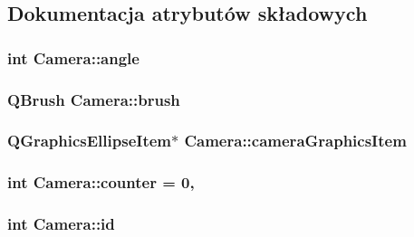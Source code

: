 \subsection{Dokumentacja atrybutów składowych}
\hypertarget{class_camera_af03876fc053f6ec72bab934db895a3bf}{
\subsubsection[{angle}]{\setlength{\rightskip}{0pt plus 5cm}int Camera\-::angle\hspace{0.3cm}{\ttfamily [private]}}}\label{class_camera_af03876fc053f6ec72bab934db895a3bf}
\hypertarget{class_camera_a42fec17d586950465bc8b04e72654462}{
\subsubsection[{brush}]{\setlength{\rightskip}{0pt plus 5cm}Q\-Brush Camera\-::brush\hspace{0.3cm}{\ttfamily [private]}}}\label{class_camera_a42fec17d586950465bc8b04e72654462}
\hypertarget{class_camera_afe62e86c4583ff405bf04251b56d38d0}{
\subsubsection[{camera\-Graphics\-Item}]{\setlength{\rightskip}{0pt plus 5cm}Q\-Graphics\-Ellipse\-Item$\ast$ Camera\-::camera\-Graphics\-Item\hspace{0.3cm}{\ttfamily [private]}}}\label{class_camera_afe62e86c4583ff405bf04251b56d38d0}
\hypertarget{class_camera_a26c98856bed4d250d0b042f71881b42c}{
\subsubsection[{counter}]{\setlength{\rightskip}{0pt plus 5cm}int Camera\-::counter = 0\hspace{0.3cm}{\ttfamily [static]}, {\ttfamily [private]}}}\label{class_camera_a26c98856bed4d250d0b042f71881b42c}
\hypertarget{class_camera_a4777e12d1a1138468a2d9023d8bff4ec}{
\subsubsection[{id}]{\setlength{\rightskip}{0pt plus 5cm}int Camera\-::id\hspace{0.3cm}{\ttfamily [private]}}}\label{class_camera_a4777e12d1a1138468a2d9023d8bff4ec}
